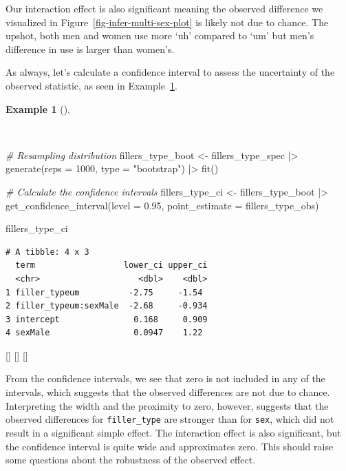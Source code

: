 \documentclass[
  letterpaper,
  krantz1]{latex/krantz-mod}
\newenvironment{Shaded}{\begin{snugshade}}{\end{snugshade}}
\newcommand{\AttributeTok}[1]{\textcolor[rgb]{0.00,0.00,0.00}{#1}}
\newcommand{\CommentTok}[1]{\textcolor[rgb]{0.00,0.00,0.00}{\textit{#1}}}
\newcommand{\DecValTok}[1]{\textcolor[rgb]{0.00,0.00,0.00}{#1}}
\newcommand{\FloatTok}[1]{\textcolor[rgb]{0.00,0.00,0.00}{#1}}
\newcommand{\FunctionTok}[1]{\textcolor[rgb]{0.00,0.00,0.00}{#1}}
\newcommand{\NormalTok}[1]{\textcolor[rgb]{0.00,0.00,0.00}{#1}}
\newcommand{\OtherTok}[1]{\textcolor[rgb]{0.00,0.00,0.00}{#1}}
\newcommand{\SpecialCharTok}[1]{\textcolor[rgb]{0.00,0.00,0.00}{#1}}
\newcommand{\StringTok}[1]{\textcolor[rgb]{0.00,0.00,0.00}{#1}}
\newcommand{\cindex}[1]{%
  \StrSubstitute{#1}{_}{\_}[\temp]%
  \index{\temp}%
}
\theoremstyle{definition}
\theoremstyle{definition}
\newtheorem{example}{Example}[chapter]
\theoremstyle{remark}
\begin{document}
Our interaction effect is also significant meaning the observed
difference we visualized in Figure~\ref{fig-infer-multi-sex-plot} is
likely not due to chance. The upshot, both men and women use more `uh'
compared to `um' but men's difference in use is larger than women's.

As always, let's calculate a confidence
interval to assess the uncertainty of the
observed statistic, as seen in Example~\ref{exm-infer-num-multi-sex-ci}.

\begin{example}[]\protect\hypertarget{exm-infer-num-multi-sex-ci}{}\label{exm-infer-num-multi-sex-ci}

~

\begin{Shaded}
\begin{Highlighting}[numbers=left,,]
\CommentTok{\# Resampling distribution}
\NormalTok{fillers\_type\_boot }\OtherTok{\textless{}{-}}
\NormalTok{  fillers\_type\_spec }\SpecialCharTok{|\textgreater{}}
  \FunctionTok{generate}\NormalTok{(}\AttributeTok{reps =} \DecValTok{1000}\NormalTok{, }\AttributeTok{type =} \StringTok{"bootstrap"}\NormalTok{) }\SpecialCharTok{|\textgreater{}}
  \FunctionTok{fit}\NormalTok{()}

\CommentTok{\# Calculate the confidence intervals}
\NormalTok{fillers\_type\_ci }\OtherTok{\textless{}{-}}
\NormalTok{  fillers\_type\_boot }\SpecialCharTok{|\textgreater{}}
  \FunctionTok{get\_confidence\_interval}\NormalTok{(}\AttributeTok{level =} \FloatTok{0.95}\NormalTok{, }\AttributeTok{point\_estimate =}\NormalTok{ fillers\_type\_obs)}

\NormalTok{fillers\_type\_ci}
\end{Highlighting}
\end{Shaded}

\begin{verbatim}
# A tibble: 4 x 3
  term                  lower_ci upper_ci
  <chr>                    <dbl>    <dbl>
1 filler_typeum          -2.75     -1.54 
2 filler_typeum:sexMale  -2.68     -0.934
3 intercept               0.168     0.909
4 sexMale                 0.0947    1.22 
\end{verbatim}

\cindex{generate()}\cindex{get_confidence_interval()}\cindex{fit()}

\end{example}

From the confidence intervals, we see that zero is not included in any
of the intervals, which suggests that the observed differences are not
due to chance. Interpreting the width and the proximity to zero,
however, suggests that the observed differences for
\texttt{filler\_type} are stronger than for \texttt{sex}, which did not
result in a significant simple effect. The interaction effect is also
significant, but the confidence interval is quite wide and approximates
zero. This should raise some questions about the robustness of the
observed effect.
\end{document}
